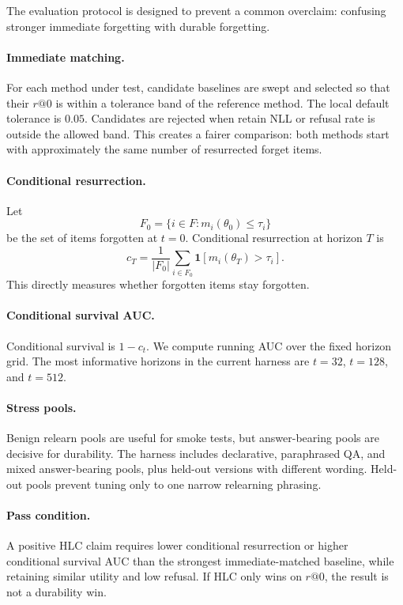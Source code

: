 The evaluation protocol is designed to prevent a common overclaim: confusing stronger immediate forgetting with durable forgetting.

\paragraph{Immediate matching.}
For each method under test, candidate baselines are swept and selected so that their $r@0$ is within a tolerance band of the reference method.
The local default tolerance is $0.05$.
Candidates are rejected when retain NLL or refusal rate is outside the allowed band.
This creates a fairer comparison: both methods start with approximately the same number of resurrected forget items.

\paragraph{Conditional resurrection.}
Let
\[
  F_0 = \{i \in F : m_i(\theta_0) \le \tau_i\}
\]
be the set of items forgotten at $t=0$.
Conditional resurrection at horizon $T$ is
\[
  c_T = \frac{1}{|F_0|}\sum_{i \in F_0}\mathbf{1}[m_i(\theta_T) > \tau_i].
\]
This directly measures whether forgotten items stay forgotten.

\paragraph{Conditional survival AUC.}
Conditional survival is $1-c_t$.
We compute running AUC over the fixed horizon grid.
The most informative horizons in the current harness are $t=32$, $t=128$, and $t=512$.

\paragraph{Stress pools.}
Benign relearn pools are useful for smoke tests, but answer-bearing pools are decisive for durability.
The harness includes declarative, paraphrased QA, and mixed answer-bearing pools, plus held-out versions with different wording.
Held-out pools prevent tuning only to one narrow relearning phrasing.

\paragraph{Pass condition.}
A positive HLC claim requires lower conditional resurrection or higher conditional survival AUC than the strongest immediate-matched baseline, while retaining similar utility and low refusal.
If HLC only wins on $r@0$, the result is not a durability win.
